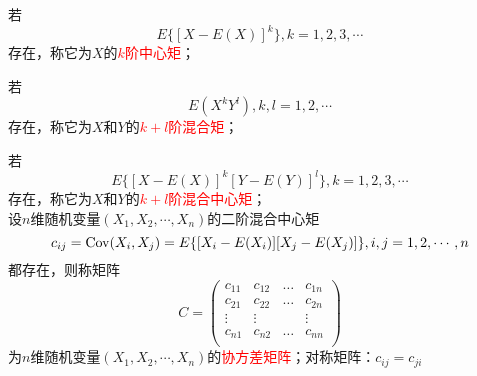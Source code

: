 \documentclass[12pt,a4paper]{article}
\begin{document}
若
\begin{equation}
E\{[X-E(X)]^k\}, k = 1,2,3,\cdots
\end{equation}
存在，称它为$X$的\textcolor{red}{$k$阶中心矩}；

若
\begin{equation}
E(X^kY^l), k, l = 1,2,\cdots
\end{equation}
存在，称它为$X$和$Y$的\textcolor{red}{$k+l$阶混合矩}；

若
\begin{equation}
E\{[X-E(X)]^k [Y-E(Y)]^l\}, k = 1,2,3,\cdots
\end{equation}
存在，称它为$X$和$Y$的\textcolor{red}{$k+l$阶混合中心矩}；\\

设$n$维随机变量$(X_1, X_2, \cdots, X_n)$的二阶混合中心矩
\begin{equation}
c_{ij} = {\rm Cov}(X_i, X_j) = E\{[X_i-E(X_i)] [X_j-E(X_j)]\}, i,j = 1,2,\cdots, n
\end{equation}
都存在，则称矩阵
\begin{equation}
C = \begin{pmatrix}
c_{11} & c_{12} & \dots & c_{1n} \\
c_{21} & c_{22} & \dots & c_{2n} \\
\vdots  & \vdots &            & \vdots \\
c_{n1} & c_{n2} & \dots & c_{nn} \\
\end{pmatrix}
\end{equation}
为$n$维随机变量$(X_1, X_2, \cdots, X_n)$的\textcolor{red}{协方差矩阵}；对称矩阵：$c_{ij} = c_{ji}$
\end{document}
